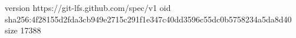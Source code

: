 version https://git-lfs.github.com/spec/v1
oid sha256:4f28155d2fda3cb949e2715c291f1e347c40dd3596c55dc0b5758234a5da8d40
size 17388

